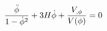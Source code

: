 \begin{equation}
{\ddot{\phi} \over {1-\dot{\phi}^2}}+3H \dot{\phi}+{V_{,\phi} \over V({\phi})}=0
\label{evolution eq}
\end{equation}

